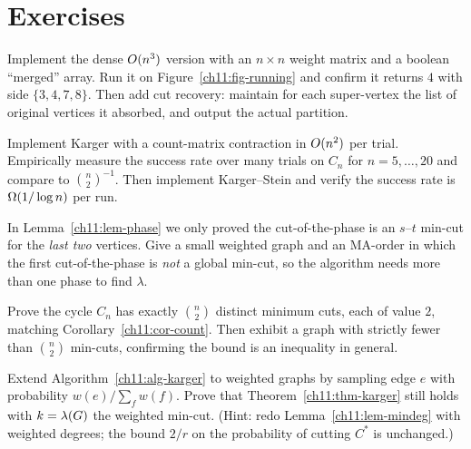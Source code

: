 \section{Exercises}

\begin{exercise}\label{ch11:ex-implsw}
Implement the dense $O(n^3)$ version with an $n\times n$ weight matrix and a boolean ``merged'' array. Run it on Figure~\ref{ch11:fig-running} and confirm it returns $4$ with side $\{3,4,7,8\}$. Then add cut recovery: maintain for each super-vertex the list of original vertices it absorbed, and output the actual partition.
\end{exercise}

\begin{exercise}\label{ch11:ex-implkarger}
Implement Karger with a count-matrix contraction in $O(n^2)$ per trial. Empirically measure the success rate over many trials on $C_n$ for $n=5,\dots,20$ and compare to $\binom n2^{-1}$. Then implement Karger--Stein and verify the success rate is $\Omega(1/\log n)$ per run.
\end{exercise}

\begin{exercise}\label{ch11:ex-tight}
In Lemma~\ref{ch11:lem-phase} we only proved the cut-of-the-phase is an $s$--$t$ min-cut for the \emph{last two} vertices. Give a small weighted graph and an MA-order in which the first cut-of-the-phase is \emph{not} a global min-cut, so the algorithm needs more than one phase to find $\lambda$.
\end{exercise}

\begin{exercise}\label{ch11:ex-cycle}
Prove the cycle $C_n$ has exactly $\binom n2$ distinct minimum cuts, each of value $2$, matching Corollary~\ref{ch11:cor-count}. Then exhibit a graph with strictly fewer than $\binom n2$ min-cuts, confirming the bound is an inequality in general.
\end{exercise}

\begin{exercise}\label{ch11:ex-weighted}
Extend Algorithm~\ref{ch11:alg-karger} to weighted graphs by sampling edge $e$ with probability $w(e)/\sum_f w(f)$. Prove that Theorem~\ref{ch11:thm-karger} still holds with $k=\lambda(G)$ the weighted min-cut. (Hint: redo Lemma~\ref{ch11:lem-mindeg} with weighted degrees; the bound $2/r$ on the probability of cutting $C^\ast$ is unchanged.)
\end{exercise}

